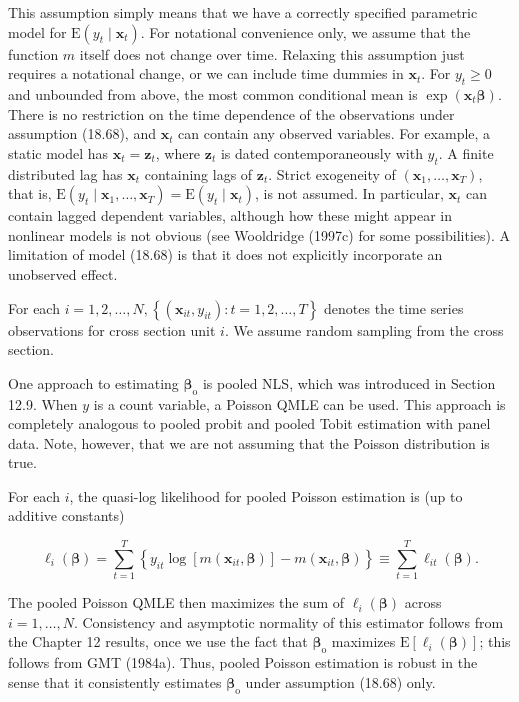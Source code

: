 \documentclass[10pt]{article}
\begin{document}
This assumption simply means that we have a correctly specified parametric model for $\mathrm{E}\left(y_{t} \mid \mathbf{x}_{t}\right)$. For notational convenience only, we assume that the function $m$ itself does not change over time. Relaxing this assumption just requires a notational change, or we can include time dummies in $\mathbf{x}_{t}$. For $y_{t} \geq 0$ and unbounded from above, the most common conditional mean is $\exp \left(\mathbf{x}_{t} \boldsymbol{\beta}\right)$. There is no restriction on the time dependence of the observations under assumption (18.68), and $\mathbf{x}_{t}$ can contain any observed variables. For example, a static model has $\mathbf{x}_{t}=\mathbf{z}_{t}$, where $\mathbf{z}_{t}$ is dated contemporaneously with $y_{t}$. A finite distributed lag has $\mathbf{x}_{t}$ containing lags of $\mathbf{z}_{t}$. Strict exogeneity of $\left(\mathbf{x}_{1}, \ldots, \mathbf{x}_{T}\right)$, that is, $\mathrm{E}\left(y_{t} \mid \mathbf{x}_{1}, \ldots, \mathbf{x}_{T}\right)=\mathrm{E}\left(y_{t} \mid \mathbf{x}_{t}\right)$, is not assumed. In particular, $\mathbf{x}_{t}$ can contain lagged dependent variables, although how these might appear in nonlinear models is not obvious (see Wooldridge (1997c) for some possibilities). A limitation of model (18.68) is that it does not explicitly incorporate an unobserved effect.

For each $i=1,2, \ldots, N,\left\{\left(\mathbf{x}_{i t}, y_{i t}\right): t=1,2, \ldots, T\right\}$ denotes the time series observations for cross section unit $i$. We assume random sampling from the cross section.

One approach to estimating $\boldsymbol{\beta}_{\mathrm{o}}$ is pooled NLS, which was introduced in Section 12.9. When $y$ is a count variable, a Poisson QMLE can be used. This approach is completely analogous to pooled probit and pooled Tobit estimation with panel data. Note, however, that we are not assuming that the Poisson distribution is true.

For each $i$, the quasi-log likelihood for pooled Poisson estimation is (up to additive constants)


\begin{equation*}
\ell_{i}(\boldsymbol{\beta})=\sum_{t=1}^{T}\left\{y_{i t} \log \left[m\left(\mathbf{x}_{i t}, \boldsymbol{\beta}\right)\right]-m\left(\mathbf{x}_{i t}, \boldsymbol{\beta}\right)\right\} \equiv \sum_{t=1}^{T} \ell_{i t}(\boldsymbol{\beta}) . \tag{18.69}
\end{equation*}


The pooled Poisson QMLE then maximizes the sum of $\ell_{i}(\boldsymbol{\beta})$ across $i=1, \ldots, N$. Consistency and asymptotic normality of this estimator follows from the Chapter 12 results, once we use the fact that $\boldsymbol{\beta}_{\mathrm{o}}$ maximizes $\mathrm{E}\left[\ell_{i}(\boldsymbol{\beta})\right]$; this follows from GMT (1984a). Thus, pooled Poisson estimation is robust in the sense that it consistently estimates $\boldsymbol{\beta}_{\mathrm{o}}$ under assumption (18.68) only.
\end{document}
